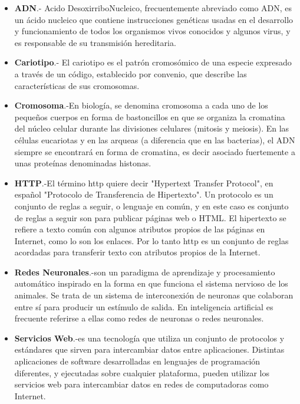 \documentclass[12pt,letterpaper,titlepage]{article}
\begin{document}
\begin{itemize}\itemsep=0pt
\item  \textbf{ADN}.- Acido DesoxirriboNucleico, frecuentemente abreviado como ADN, es un ácido nucleico que contiene instrucciones genéticas usadas en el desarrollo y funcionamiento de todos los organismos vivos conocidos y algunos virus, y es responsable de su transmisión hereditaria.\\
\item  \textbf{Cariotipo}.- El cariotipo es el patrón cromosómico de una especie expresado a través de un código, establecido por convenio, que describe las características de sus cromosomas.\\
\item \textbf{Cromosoma}.-En biología, se denomina cromosoma a cada uno de los pequeños cuerpos en forma de bastoncillos en que se organiza la cromatina del núcleo celular durante las divisiones celulares (mitosis y meiosis). En las células eucariotas y en las arqueas (a diferencia que en las bacterias), el ADN siempre se encontrará en forma de cromatina, es decir asociado fuertemente a unas proteínas denominadas histonas.\\
\item \textbf{HTTP}.-El término http quiere decir "Hypertext Transfer Protocol", en español "Protocolo de Transferencia de Hipertexto". Un protocolo es un conjunto de reglas a seguir, o lenguaje en común, y en este caso es conjunto de reglas a seguir son para publicar páginas web o HTML. El hipertexto se refiere a texto común con algunos atributos propios de las páginas en Internet, como lo son los enlaces. Por lo tanto http es un conjunto de reglas acordadas para transferir texto con atributos propios de la Internet.\\
\item \textbf{Redes Neuronales}.-son un paradigma de aprendizaje y procesamiento automático inspirado en la forma en que funciona el sistema nervioso de los animales. Se trata de un sistema de interconexión de neuronas que colaboran entre sí para producir un estímulo de salida. En inteligencia artificial es frecuente referirse a ellas como redes de neuronas o redes neuronales.\\
\item \textbf{Servicios Web}.-es una tecnología que utiliza un conjunto de protocolos y estándares que sirven para intercambiar datos entre aplicaciones. Distintas aplicaciones de software desarrolladas en lenguajes de programación diferentes, y ejecutadas sobre cualquier plataforma, pueden utilizar los servicios web para intercambiar datos en redes de computadoras como Internet.\\

\end{itemize}
\end{document}
